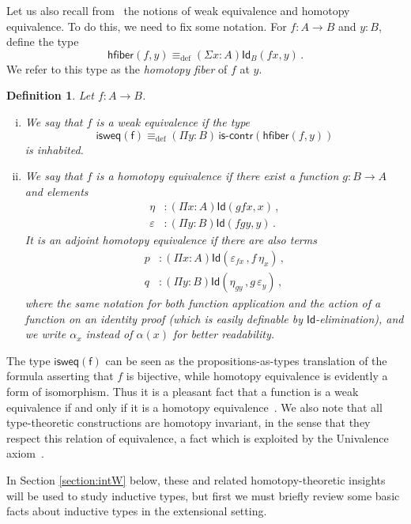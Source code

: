 \documentclass[reqno,10pt,a4paper,oneside]{amsart}
\numberwithin{equation}{section}
\theoremstyle{mythm}
\theoremstyle{mydef}
\newtheorem{definition}[theorem]{Definition}
\theoremstyle{myrmk}
\newcommand{\deq}{\equiv}
\newcommand{\defeq}{\deq_{\mathrm{def}}}
\newcommand{\iscontr}{\mathsf{is}\text{-}\mathsf{contr}}
\newcommand{\hfiber}{\mathsf{hfiber}}
\newcommand{\Id}{\mathsf{Id}}
\newcommand{\id}[1]{\Id_{#1}}
\begin{document}
Let us also recall from~\cite{VoevodskyV:unifc} the notions of weak equivalence and homotopy equivalence. To do this, we need to fix some notation. For $f : A \rightarrow B$
and $y : B$, define the type
\[
 \hfiber(f,y) \defeq (\Sigma x : A) \id{B}(f x, y) \, .
\]
We refer to this type as the \emph{homotopy fiber} of $f$ at $y$. 

\begin{definition} \label{thm:weq} Let $f : A \rightarrow B$.
\begin{enumerate}[(i)] 
%
\item We say that $f$ is a \emph{weak equivalence} if  the type
\[
\mathsf{isweq(f)} \defeq (\Pi y : B) \,  \iscontr(\hfiber(f,y)) 
\]
is inhabited. 
%
\item We say that $f$ is a \emph{homotopy equivalence} if there exist a function 
$g : B\rightarrow A$ and elements
\begin{align*}
\eta &: (\Pi x : A) \Id( g  f  x , x) \,  ,\\
\varepsilon &: (\Pi y:B) \Id( f   g  y, y) \, .
\end{align*}
It is an \emph{adjoint homotopy equivalence} if there are also
terms
\begin{align*}
p &: (\Pi x : A) \Id ( \varepsilon_{f x} \, , f \, \eta_x )  \, , \\
q &: (\Pi y : B) \Id ( \eta_{g y} \, , g \, \varepsilon_y) \, ,
\end{align*}
where the same notation for both function application and
the action of a function on an identity proof (which is easily definable by $\Id$-elimination),
and we write $\alpha_x$ instead of $\alpha(x)$ for better readability.
%
\end{enumerate}
\end{definition}

The type $\mathsf{isweq(f)}$ can be seen as the propositions-as-types translation of the formula asserting that $f$ is bijective, while homotopy equivalence is evidently a form of isomorphism. Thus it is a pleasant fact that a function is a weak equivalence if and only if it is a homotopy equivalence~\cite{VoevodskyV:unifc}. 
We also note that all type-theoretic constructions are homotopy invariant, in the sense that they respect this relation of equivalence, a fact which is exploited by the Univalence axiom~\cite{VoevodskyV:notts}.


\medskip

In Section \ref{section:intW} below, these and related homotopy-theoretic insights will be used to study inductive types, but first we must briefly review some basic facts about  inductive types in the extensional setting.
\end{document}

